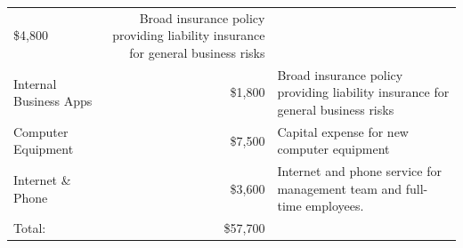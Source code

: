 \documentclass[10pt,openany]{book}
\begin{document}
\begin{longtable}[]{@{}lrl@{}}
\begin{minipage}[t]{0.12\columnwidth}
\$4,800\strut
\end{minipage} & \begin{minipage}[t]{0.48\columnwidth}\raggedright
Broad insurance policy providing liability insurance for general
business risks\strut
\end{minipage}\tabularnewline
\begin{minipage}[t]{0.31\columnwidth}\raggedright
Internal Business Apps\strut
\end{minipage} & \begin{minipage}[t]{0.12\columnwidth}\raggedleft
\$1,800\strut
\end{minipage} & \begin{minipage}[t]{0.48\columnwidth}\raggedright
Broad insurance policy providing liability insurance for general
business risks\strut
\end{minipage}\tabularnewline
\begin{minipage}[t]{0.31\columnwidth}\raggedright
Computer Equipment\strut
\end{minipage} & \begin{minipage}[t]{0.12\columnwidth}\raggedleft
\$7,500\strut
\end{minipage} & \begin{minipage}[t]{0.48\columnwidth}\raggedright
Capital expense for new computer equipment\strut
\end{minipage}\tabularnewline
\begin{minipage}[t]{0.31\columnwidth}\raggedright
Internet \& Phone\strut
\end{minipage} & \begin{minipage}[t]{0.12\columnwidth}\raggedleft
\$3,600\strut
\end{minipage} & \begin{minipage}[t]{0.48\columnwidth}\raggedright
Internet and phone service for management team and full-time
employees.\strut
\end{minipage}\tabularnewline
\begin{minipage}[t]{0.31\columnwidth}\raggedright
Total:\strut
\end{minipage} & \begin{minipage}[t]{0.12\columnwidth}\raggedleft
\$57,700\strut
\end{minipage} & \begin{minipage}[t]{0.48\columnwidth}\raggedright
\strut
\end{minipage}\tabularnewline
\bottomrule
\end{longtable}
\end{document}
